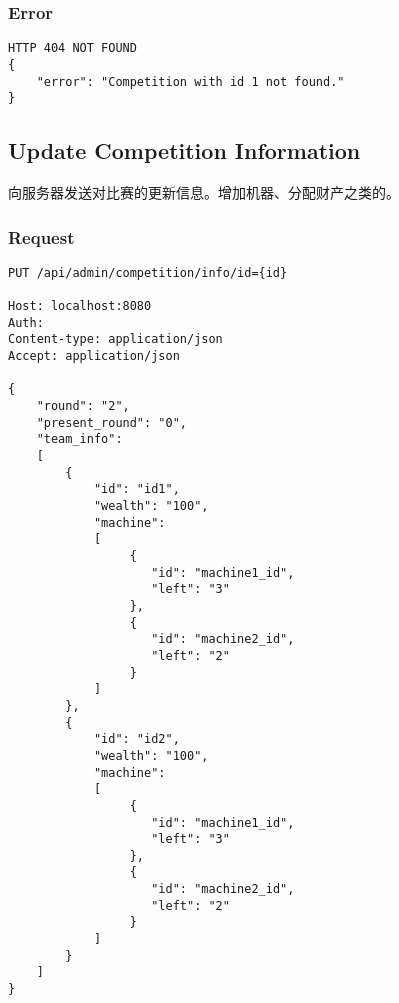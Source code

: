 \documentclass{article}
\begin{document}
\subsubsection*{Error}
\begin{lstlisting}
HTTP 404 NOT FOUND
{
    "error": "Competition with id 1 not found."
}
\end{lstlisting}

\subsection{Update Competition Information}
向服务器发送对比赛的更新信息。增加机器、分配财产之类的。

\subsubsection*{Request}
\begin{lstlisting}
PUT /api/admin/competition/info/id={id}

Host: localhost:8080
Auth:
Content-type: application/json
Accept: application/json

{
    "round": "2",
    "present_round": "0",
    "team_info":
    [
        {
            "id": "id1",
            "wealth": "100",
            "machine":
            [
                 {
                    "id": "machine1_id",
                    "left": "3"
                 },
                 {
                    "id": "machine2_id",
                    "left": "2"
                 }
            ]
        },
        {
            "id": "id2",
            "wealth": "100",
            "machine":
            [
                 {
                    "id": "machine1_id",
                    "left": "3"
                 },
                 {
                    "id": "machine2_id",
                    "left": "2"
                 }
            ]
        }
    ]
}
\end{lstlisting}
\end{document}
